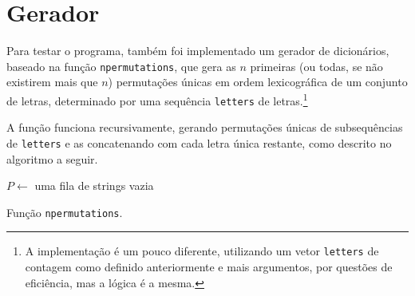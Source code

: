 \documentclass[a4paper]{article}
\begin{document}
\newpage
\section{Gerador}
    Para testar o programa, também foi implementado um gerador de dicionários, baseado na função \texttt{npermutations}, que gera as $n$ primeiras (ou todas, se não existirem mais que $n$) permutações únicas em ordem lexicográfica de um conjunto de letras, determinado por uma sequência \texttt{letters} de letras.\footnote{A implementação é um pouco diferente, utilizando um vetor \texttt{letters} de contagem como definido anteriormente e mais argumentos, por questões de eficiência, mas a lógica é a mesma.}

    A função funciona recursivamente, gerando permutações únicas de subsequências de \texttt{letters} e as concatenando com cada letra única restante, como descrito no algoritmo a seguir.

    \begin{algorithm}[h]
        \BlankLine

        $P \leftarrow$ uma fila de strings vazia\;
        \BlankLine
        \BlankLine
        \BlankLine
        \;
        \caption{Função \texttt{npermutations}.}
    \end{algorithm}
\end{document}
